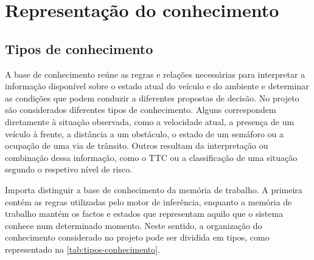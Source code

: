 \chapter{Representação do conhecimento}
\label{cap:representacao}

\section{Tipos de conhecimento}
\label{sec:tipos-conhecimento}

A base de conhecimento reúne as regras e relações necessárias para
interpretar a informação disponível sobre o estado atual do veículo e do
ambiente e determinar as condições que podem conduzir a diferentes propostas
de decisão. No projeto são considerados diferentes tipos de conhecimento.
Alguns correspondem diretamente à situação observada, como a velocidade
atual, a presença de um veículo à frente, a distância a um obstáculo, o
estado de um semáforo ou a ocupação de uma via de trânsito. Outros resultam
da interpretação ou combinação dessa informação, como o TTC ou a
classificação de uma situação segundo o respetivo nível de risco.

Importa distinguir a base de conhecimento da memória de trabalho. A primeira
contém as regras utilizadas pelo motor de inferência, enquanto a memória de
trabalho mantém os factos e estados que representam aquilo que o sistema
conhece num determinado momento. Neste sentido, a organização do
conhecimento considerado no projeto pode ser dividida em tipos, como
representado na \cref{tab:tipos-conhecimento}.

